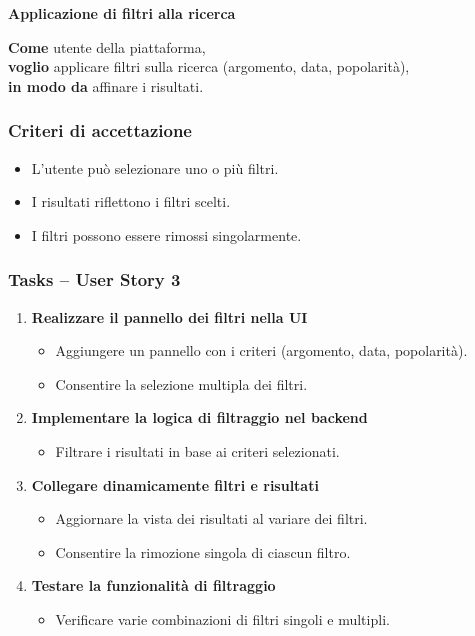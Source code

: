 \documentclass{article}
\begin{document}
\textbf{Applicazione di filtri alla ricerca}

\textbf{Come} utente della piattaforma,\\
\textbf{voglio} applicare filtri sulla ricerca (argomento, data, popolarità),\\
\textbf{in modo da} affinare i risultati.

\subsubsection{Criteri di accettazione}
\begin{itemize}
    \item L’utente può selezionare uno o più filtri.
    \item I risultati riflettono i filtri scelti.
    \item I filtri possono essere rimossi singolarmente.
\end{itemize}

\subsubsection{Tasks -- User Story 3}
\begin{enumerate}
    \item \textbf{Realizzare il pannello dei filtri nella UI}
    \begin{itemize}
        \item Aggiungere un pannello con i criteri (argomento, data, popolarità).
        \item Consentire la selezione multipla dei filtri.
    \end{itemize}

    \item \textbf{Implementare la logica di filtraggio nel backend}
    \begin{itemize}
        \item Filtrare i risultati in base ai criteri selezionati.
    \end{itemize}

    \item \textbf{Collegare dinamicamente filtri e risultati}
    \begin{itemize}
        \item Aggiornare la vista dei risultati al variare dei filtri.
        \item Consentire la rimozione singola di ciascun filtro.
    \end{itemize}

    \item \textbf{Testare la funzionalità di filtraggio}
    \begin{itemize}
        \item Verificare varie combinazioni di filtri singoli e multipli.
    \end{itemize}
\end{enumerate}
\end{document}

